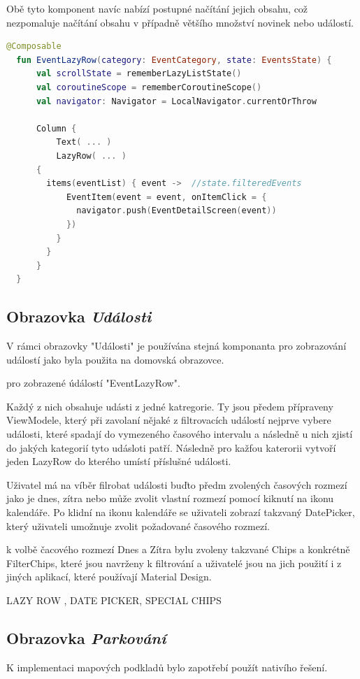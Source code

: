 Obě tyto komponent navíc nabízí postupné načítání jejich obsahu, což nezpomaluje načítání obsahu v případně většího množství novinek
nebo událostí.

\begin{lstlisting}[caption={Coil}, label={lst:Coil3}, language=Kotlin]
  @Composable
  fun EventLazyRow(category: EventCategory, state: EventsState) {
      val scrollState = rememberLazyListState()
      val coroutineScope = rememberCoroutineScope()
      val navigator: Navigator = LocalNavigator.currentOrThrow
  
      Column {
          Text( ... )
          LazyRow( ... ) 
      {  
        items(eventList) { event ->  //state.filteredEvents
            EventItem(event = event, onItemClick = {
              navigator.push(EventDetailScreen(event))
            })
          }
        }
      }
  }
\end{lstlisting}

\subsection{Obrazovka \textit{Události}}

V rámci obrazovky "Události" je používána stejná komponanta pro zobrazování událostí jako byla použita na domovská obrazovce. 

pro zobrazené údálostí "EventLazyRow". 

Každý z nich obsahuje udásti z jedné katregorie. Ty jsou předem přípraveny ViewModele, který při zavolaní nějaké z filtrovacích
událostí nejprve vybere události, které spadají do vymezeného časového intervalu a následně u nich zjistí do jakých kategorií tyto
udásloti patří. Následně pro kažfou katerorii vytvoří jeden LazyRow do kterého umístí příslušné události.

Uživatel má na víběr filrobat události buďto předm zvolených časových rozmezí jako je dnes, zítra nebo může zvolit vlastní 
rozmezí pomocí kiknutí na ikonu kalendáře. Po klidní na ikonu kalendáře se uživateli zobrazí takzvaný DatePicker, který 
uživateli umožnuje zvolit požadované časového rozmezí.

k volbě čacového rozmezí Dnes a Zítra bylu zvoleny takzvané Chips a konkrétně FilterChips, které jsou navrženy k filtrování
a uživatelé jsou na jich použití i z jiných aplikací, které používají Material Design.


LAZY ROW , DATE PICKER, SPECIAL CHIPS


\subsection{Obrazovka \textit{Parkování}} \label{parkingScreenImpl}
K implementaci mapových podkladů bylo zapotřebí použít nativího řešení. 


